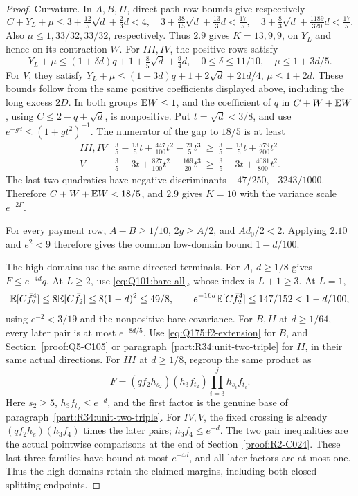 \begin{proof}
Curvature. In \(A,B,II\), direct path-row bounds give respectively
\[
 C+Y_L+\mu\le
 3+\tfrac{12}{5}\sqrt d+\tfrac23d<4,\quad
 3+\tfrac{38}{15}\sqrt d+\tfrac{13}{3}d<\tfrac{17}{5},\quad
 3+\tfrac83\sqrt d+\tfrac{1189}{320}d<\tfrac{17}{5}.
\]
Also \(\mu\le1,33/32,33/32\), respectively. Thus \(2.9\)
gives \(K=13,9,9\), on \(Y_L\) and hence on its contraction \(W\).
For \(III,IV\), the positive rows satisfy
\[
 Y_L+\mu\le(1+\delta d)q+1+\tfrac85\sqrt d+\tfrac94d,
 \quad0\le\delta\le11/10,\quad\mu\le1+3d/5.
\]
For \(V\), they satisfy
\(Y_L+\mu\le(1+3d)q+1+2\sqrt d+21d/4\),
\(\mu\le1+2d\). These bounds follow from the same positive
coefficients displayed above, including the long excess \(2D\).
In both groups \(\mathbb E W\le1\), and the coefficient of \(q\) in
\(C+W+\mathbb E W\), using \(C\le2-q+\sqrt d\), is nonpositive.
Put \(t=\sqrt d<3/8\), and use \(e^{-gd}\le(1+gt^2)^{-1}\).
The numerator of the gap to \(18/5\) is at least
\[
\begin{array}{c|l}
III,IV&\frac35-\frac{13}{5}t+\frac{447}{100}t^2-\frac{21}{5}t^3
 \ \ge\ \frac35-\frac{13}{5}t+\frac{579}{200}t^2\\
V&\frac35-3t+\frac{827}{100}t^2-\frac{169}{20}t^3
 \ \ge\ \frac35-3t+\frac{4081}{800}t^2.
\end{array}
\]
The last two quadratics have negative discriminants
\(-47/250,-3243/1000\). Therefore \(C+W+\mathbb E W<18/5\),
and \(2.9\) gives \(K=10\) with the variance scale \(e^{-2\Gamma}\).

For every payment row, \(A-B\ge1/10\), \(2g\ge A/2\), and
\(Ad_0/2<2\). Applying \(2.10\) and \(e^2<9\) therefore gives
the common low-domain bound \(1-d/100\).

The high domains use the same directed terminals. For \(A\),
\(d\ge1/8\) gives \(F\le e^{-4d}q\). At \(L\ge2\), use
\eqref{eq:Q101:bare-all}, whose index is \(L+1\ge3\). At \(L=1\),
\[
 \mathbb E[C\bar f_2^4]\le8\mathbb E[C\bar f_2]\le8(1-d)^2\le49/8,
 \qquad e^{-16d}\mathbb E[C\bar f_2^4]\le147/152<1-d/100,
\]
using \(e^{-2}<3/19\) and the nonpositive bare covariance.
For \(B,II\) at \(d\ge1/64\), every later pair is at most
\(e^{-8d/5}\). Use \eqref{eq:Q175:f2-extension} for \(B\), and
Section~\ref{proof:Q5-C105} or paragraph~\ref{part:R34:unit-two-triple}
for \(II\), in their same actual directions.
For \(III\) at \(d\ge1/8\), regroup the same product as
\[
 F=(qf_2h_{s_2})(h_3f_{t_2})\prod_{i=3}^j h_{s_i}f_{t_i}.
\]
Here \(s_2\ge5\), \(h_3f_{t_2}\le e^{-d}\), and the first factor
is the genuine base of paragraph~\ref{part:R34:unit-two-triple}.
For \(IV,V\), the fixed crossing
is already \((qf_2h_e)(h_3f_4)\) times the later pairs;
\(h_3f_4\le e^{-d}\). The two pair inequalities are the actual
pointwise comparisons at the end of Section~\ref{proof:R2-C024}.
These last three families have bound at most \(e^{-4d}\), and
all later factors are at most one. Thus the high domains retain the
claimed margins, including both closed splitting endpoints.
\end{proof}

